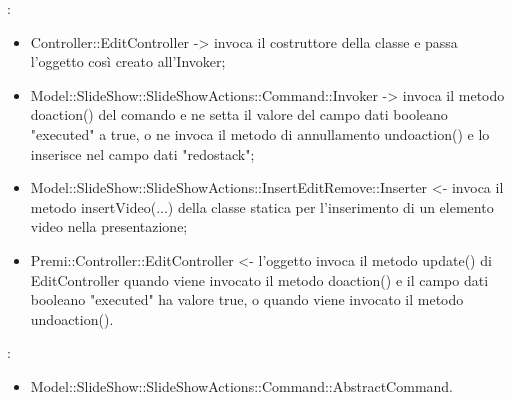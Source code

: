 {{				\textbf{\relaz}: 
				\begin{itemize}
					\item Controller::\-EditController -> invoca il costruttore della classe e passa l’oggetto così creato all’Invoker;
					\item Model::\-SlideShow::\-SlideShowActions::\-Command::\-Invoker -> invoca il metodo doaction() del comando  e ne setta il valore del campo dati booleano "executed" a true, o ne invoca il metodo di annullamento undoaction() e lo inserisce nel campo dati "redostack";
                    \item Model::\-SlideShow::\-SlideShowActions::\-InsertEditRemove::\-Inserter <- invoca il metodo insertVideo(...) della classe statica per l’inserimento di un elemento video nella presentazione;
                    \item Premi::\-Controller::\-EditController <- l'oggetto invoca il metodo update() di EditController quando viene invocato il metodo doaction() e il campo dati booleano "executed" ha valore true, o quando viene invocato il metodo undoaction().
				\end{itemize}	
                \textbf{\base}: 
                    \begin{itemize}
                    \item Model::\-SlideShow::\-SlideShowActions::\-Command::\-AbstractCommand.
                    \end{itemize}
                    }
                }
